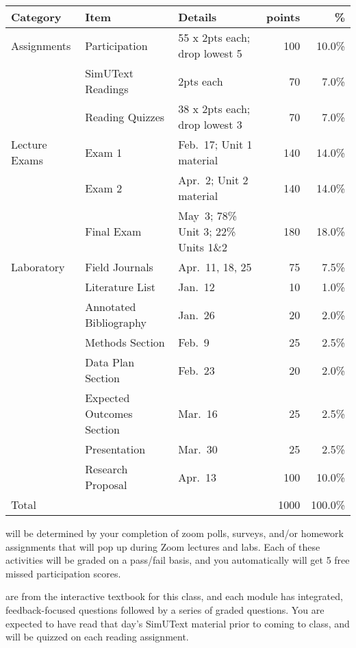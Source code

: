 \documentclass{tufte-handout}
\begin{document}
\begin{fullwidth}

\begin{table}
\begin{tabular}{l l l r r}
Category & Item & Details & points & \% \\
\hline
Assignments & Participation & 55 x 2pts each; drop lowest 5 & 100 & 10.0\% \\
& SimUText Readings   & 2pts each & 70 & 7.0\% \\
& Reading Quizzes  & 38 x 2pts each; drop lowest 3 & 70 & 7.0\% \\
\hline
Lecture Exams & Exam 1 & Feb.~17; Unit 1 material & 140 & 14.0\% \\
& Exam 2 & Apr.~2; Unit 2 material & 140 & 14.0\% \\
& Final Exam & May~3; 78\% Unit 3; 22\% Units 1\&2 & 180 & 18.0\% \\ 		
\hline
Laboratory & Field Journals & Apr.~11, 18, 25 & 75 & 7.5\% \\
& Literature List & Jan.~12 & 10 & 1.0\% \\
& Annotated Bibliography & Jan.~26 & 20 & 2.0\% \\
& Methods Section & Feb.~9 & 25 & 2.5\% \\
& Data Plan Section & Feb.~23 & 20 & 2.0\% \\
& Expected Outcomes Section & Mar.~16 & 25 & 2.5\% \\
& Presentation & Mar.~30 & 25 & 2.5\% \\
& Research Proposal & Apr.~13 & 100 & 10.0\% \\
\hline
Total & & & 1000 & 100.0\% 
\end{tabular}
\end{table}




 will be determined by your completion of zoom polls, surveys, and/or homework assignments that will pop up during Zoom lectures and labs. Each of these activities will be graded on a pass/fail basis, and you automatically will get 5 free missed participation scores. 



 are from the interactive textbook for this class, and each module has integrated, feedback-focused questions followed by a series of graded questions. \color{blue}You are expected to have read that day's SimUText material prior to coming to class, and will be quizzed on each reading assignment. \color{black} 

\end{fullwidth}
\end{document}

